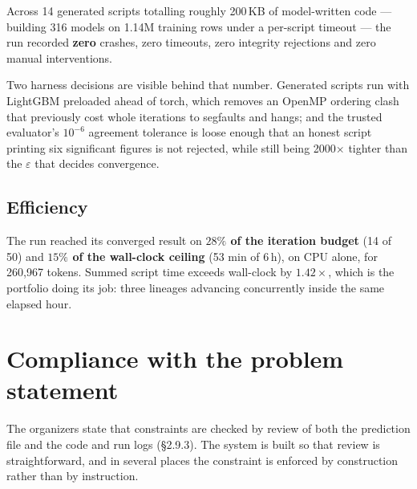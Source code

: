 \documentclass[11pt,a4paper]{article}
\begin{document}
Across 14 generated scripts totalling roughly 200\,KB of model-written code --- building 316
models on 1.14M training rows under a per-script timeout --- the run recorded \textbf{zero}
crashes, zero timeouts, zero integrity rejections and zero manual interventions.

Two harness decisions are visible behind that number. Generated scripts run with LightGBM
preloaded ahead of torch, which removes an OpenMP ordering clash that previously cost whole
iterations to segfaults and hangs; and the trusted evaluator's $10^{-6}$ agreement tolerance is
loose enough that an honest script printing six significant figures is not rejected, while
still being 2000$\times$ tighter than the $\varepsilon$ that decides convergence.

\subsection{Efficiency}

The run reached its converged result on \textbf{$28\%$ of the iteration budget} (14 of 50) and
\textbf{$15\%$ of the wall-clock ceiling} (53 min of 6\,h), on CPU alone, for 260{,}967 tokens.
Summed script time exceeds wall-clock by $1.42\times$, which is the portfolio doing its job:
three lineages advancing concurrently inside the same elapsed hour.

\section{Compliance with the problem statement}
\label{sec:compliance}

The organizers state that constraints are checked by review of both the prediction file and the
code and run logs (\S2.9.3). The system is built so that review is straightforward, and in
several places the constraint is enforced by construction rather than by instruction.
\end{document}
